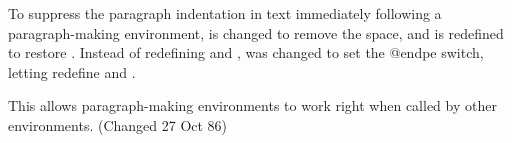  
 \begin{macro}{\@endparenv}
 \begin{macro}{\@doendpe}
 To suppress the paragraph indentation in text immediately following
 a paragraph-making environment,  is changed to remove the
 space, and  is redefined to restore .  Instead of
 redefining  and ,  was changed to 
 set the @endpe switch, letting  redefine  and 
 .  

 This allows paragraph-making environments to work right when called 
 by other environments. (Changed 27 Oct 86)
    \begin{teX}
\def\@endparenv{%
  \addpenalty\@endparpenalty\addvspace\@topsepadd\@endpetrue}
    \end{teX}

    \begin{teX}
\def\@doendpe{\@endpetrue
     \def\par{\@restorepar\everypar{}
          \par\@endpefalse}\everypar
    \end{teX}
    
    Use |\setbox0=\lastbox| instead of   |\hskip -\parindent|   
    so that a \cs{noindent} becomes a no-op when used before 
    a line immediately following a list environment(23 Oct 86).
 \changes{v1.0k}{1995/11/07}{Enclosed \cs{setbox0} assignment by a
 group so that it leaves the contents of box $0$ intact.
    } 
    \begin{teX}
               {{\setbox\z@\lastbox}\everypar{}\@endpefalse}}
    \end{teX}
 \end{macro}
 \end{macro}

 
 \begin{macro}{\if@endpe}
 \begin{macro}{\@endpefalse}
 \begin{macro}{\@endpeltrue}
    \begin{teX}
\newif\if@endpe
\@endpefalse
    \end{teX}
 \end{macro}\end{macro}\end{macro}

 
 \begin{macro}{\@mklab}
    \begin{teX}
\def\@mklab#1{\hfil #1}
    \end{teX}
 \end{macro}


